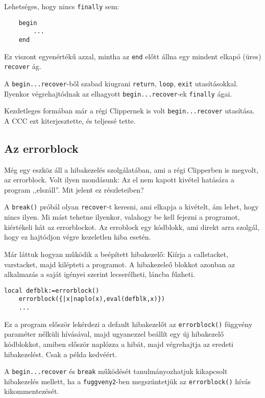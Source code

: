 Lehetséges, hogy nincs \verb!finally! sem:
\begin{verbatim}
    begin
        ...
    end
\end{verbatim}
Ez viszont egyenértékű azzal, mintha az \verb!end! előtt állna
egy mindent elkapó (üres) \verb!recover! ág.

A  \verb!begin...recover!-ből szabad kiugrani 
\verb!return!, \verb!loop!, \verb!exit! utasításokkal.
Ilyenkor végrehajtódnak az elhagyott \verb!begin...recover!-ek \verb!finally! ágai.


Kezdetleges formában már a régi Clippernek is volt \verb!begin...recover! 
utasítása. A CCC ezt kiterjesztette, és teljessé tette.


\subsection{Az errorblock}

Még egy eszköz áll a hibakezelés szolgálatában, 
ami  a régi Clipperben is megvolt, az errorblock.  
Volt ilyen mondásunk: Az el nem kapott kivétel hatására a program ,,elszáll''.
Mit jelent ez részleteiben?

A \verb!break()! próbál olyan \verb!recover!-t keresni, 
ami elkapja a kivételt, ám lehet, hogy nincs ilyen. 
Mi mást tehetne ilyenkor, valahogy be kell fejezni a programot,
kiértékeli hát az errorblockot. Az erroblock egy kódblokk,
ami direkt arra szolgál, hogy ez hajtódjon végre kezeletlen hiba esetén.

Már láttuk hogyan működik a beépített hibakezelő:
Kiírja a callstacket, varstacket, majd kilépteti a programot.
A hibakezeleő blokkot azonban az alkalmazás a saját igényei szerint 
lecserélheti, láncba fűzheti.
\begin{verbatim}
local defblk:=errorblock()
    errorblock({|x|naplo(x),eval(defblk,x)})
    ...
\end{verbatim}
Ez a program először lekérdezi a default hibakezelőt
az \verb!errorblock()! függvény paraméter nélküli hívásával,
majd ugyanezzel  beállít egy új hibakezelő kódblokkot,
amiben először naplózza a hibát, majd végrehajtja az eredeti hibakezelést.
Csak a példa kedvéért.

A \verb!begin...recover! és \verb!break! működését tanulmányozhatjuk
kikapcsolt hibakezelés mellett, ha a \verb!fuggveny2!-ben megszüntetjük
az \verb!errorblock()! hívás kikommentezését.





